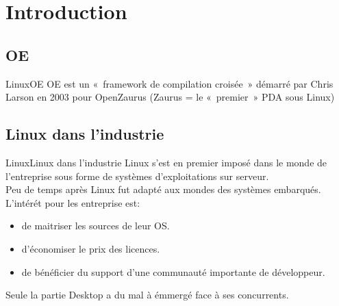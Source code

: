 \section{Introduction}

\subsection{OE}
\begin{frame}{Linux}{OE}
	OE est un « framework de compilation croisée » démarré par Chris Larson en 2003 pour OpenZaurus (Zaurus = le « premier » PDA sous Linux)\\
	
\end{frame}

\subsection{Linux dans l'industrie}
\begin{frame}{Linux}{Linux dans l'industrie}
	Linux s'est en premier imposé dans le monde de l'entreprise sous forme de systèmes d'exploitations sur serveur.\\
	Peu de temps après Linux fut adapté aux mondes des systèmes embarqués.\\
	L'intérét pour les entreprise est:
	\begin{itemize}
		\item
			de maitriser les sources de leur OS.\\
		\item
			d'économiser le prix des licences.\\
		\item
			de bénéficier du support d'une communauté importante de développeur.\\
	\end{itemize}
	Seule la partie Desktop a du mal à émmergé face à ses concurrents.\\
\end{frame}